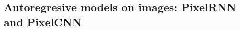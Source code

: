 \documentclass[9pt]{beamer}
\begin{document}

\subsection{Autoregresive models on images: PixelRNN and PixelCNN}
\end{document}
